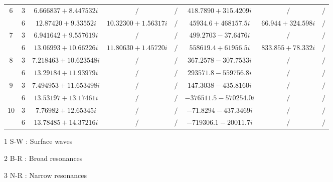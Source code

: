 \documentclass[aps,prd,longbibliography,reprint,twocolumn,amsmath,amssymb,amsfonts,showpacs,superscriptaddress]{revtex4-1}%
\begin{document}
\begin{table}[htp]
\begin{threeparttable}[htp]
\begin{ruledtabular}
\begin{tabular}{cccccccc}
$6$  & $3$  & $ 6.666837+8.447532 i $  & $/ $  & $ /$  & $418.7890+315.4209 i$ & $/ $ & $/ $  \\
     & $6$  & $ 12.87420+9.33552 i $  & $ 10.32300+1.56317 i$  & $/ $  & $45934.6+468157.5 i $ & $ 66.944+324.598 i$ & $/ $  \\

$7$  & $3$  & $ 6.941642+9.557619 i $  & $ /$  & $/ $  & $499.2703-37.6476 i $ & $ /$ & $ /$  \\
     & $6$  & $13.06993+10.66226 i $  & $ 11.80630+1.45720 i  $  & $ /$  & $558619.4+61956.5 i $ & $ 833.855+78.332 i $ & $/ $  \\

$8$  & $3$  & $7.218463+10.623548 i $  & $ /$  & $/ $  & $ 367.2578-307.7533 i  $ & $ /$ & $/ $  \\
     & $6$  & $13.29184+11.93979 i $  & $/ $  & $/ $  & $ 293571.8-559756.8 i $ & $/ $ & $/ $  \\

$9$  & $3$  & $ 7.494953+11.653498 i $  & $/ $  & $/ $  & $147.3038-435.8160 i  $ & $ /$ & $/ $  \\
     & $6$  & $ 13.53197+13.17461 i  $  & $/ $  & $/ $  & $ -376511.5-570254.0 i  $ & $/$ & $ /$  \\

$10$ & $3$  & $7.76982+12.65345 i $  & $/ $  & $/ $  & $-71.8294-437.3469 i  $ & $/ $ & $ /$  \\
     & $6$  & $ 13.78485+14.37216 i$  & $ /$  & $/ $  & $ -719306.1-20011.7 i $ & $ /$ & $/ $  \\

\end{tabular}
\end{ruledtabular}
\begin{tablenotes}
     \item[1] S-W : Surface waves
     \item[2] B-R : Broad resonances
     \item[3] N-R : Narrow  resonances
   \end{tablenotes}
\end{threeparttable}
\end{table}
\endgroup
\end{document}
